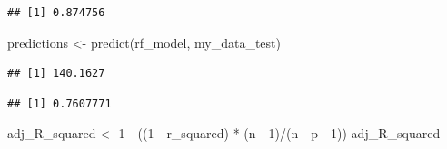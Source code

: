 \documentclass[
]{article}
\newenvironment{Shaded}{\begin{snugshade}}{\end{snugshade}}
\newcommand{\DecValTok}[1]{\textcolor[rgb]{0.00,0.00,0.81}{#1}}
\newcommand{\FunctionTok}[1]{\textcolor[rgb]{0.00,0.00,0.00}{#1}}
\newcommand{\NormalTok}[1]{#1}
\newcommand{\OtherTok}[1]{\textcolor[rgb]{0.56,0.35,0.01}{#1}}
\newcommand{\SpecialCharTok}[1]{\textcolor[rgb]{0.00,0.00,0.00}{#1}}
\begin{document}
\begin{verbatim}
## [1] 0.874756
\end{verbatim}

\begin{Shaded}
\begin{Highlighting}[]
\NormalTok{predictions }\OtherTok{\textless{}{-}} \FunctionTok{predict}\NormalTok{(rf\_model, my\_data\_test)}
\end{Highlighting}
\end{Shaded}

\begin{Shaded}
\end{Shaded}

\begin{verbatim}
## [1] 140.1627
\end{verbatim}

\begin{Shaded}
\end{Shaded}

\begin{verbatim}
## [1] 0.7607771
\end{verbatim}

\begin{Shaded}
\begin{Highlighting}[]
\NormalTok{adj\_R\_squared }\OtherTok{\textless{}{-}} \DecValTok{1} \SpecialCharTok{{-}}\NormalTok{ ((}\DecValTok{1} \SpecialCharTok{{-}}\NormalTok{ r\_squared) }\SpecialCharTok{*}\NormalTok{ (n }\SpecialCharTok{{-}} \DecValTok{1}\NormalTok{)}\SpecialCharTok{/}\NormalTok{(n }\SpecialCharTok{{-}}\NormalTok{ p }\SpecialCharTok{{-}} \DecValTok{1}\NormalTok{))}
\NormalTok{adj\_R\_squared}
\end{Highlighting}
\end{Shaded}
\end{document}
